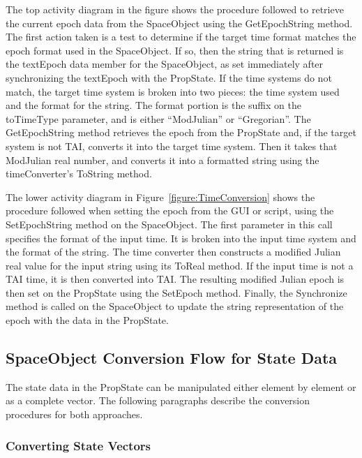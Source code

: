 The top activity diagram in the figure shows the procedure followed to retrieve the current epoch
data from the SpaceObject using the GetEpochString method.  The first action taken is a test to
determine if the target time format matches the epoch format used in the SpaceObject.  If so, then
the string that is returned is the textEpoch data member for the SpaceObject, as set immediately
after synchronizing the textEpoch with the PropState.  If the time systems do not match, the target
time system is broken into two pieces: the time system used and the format for the string. The
format portion is the suffix on the toTimeType parameter, and is either ``ModJulian'' or
``Gregorian''.  The GetEpochString method retrieves the epoch from the PropState and, if the
 target system is not TAI, converts it into the target time system.  Then it takes that ModJulian
real number, and converts it into a formatted string using the timeConverter's ToString method.

The lower activity diagram in Figure~\ref{figure:TimeConversion} shows the procedure followed when
setting the epoch from the GUI or script, using the SetEpochString method on the SpaceObject.  The
first parameter in this call specifies the format of the input time.  It is broken into the input
time system and the format of the string.  The time converter then constructs a modified Julian
real value for the input string using its ToReal method.  If the input time is not a TAI time, it
is then converted into TAI.  The resulting modified Julian epoch is then set on the PropState using
the SetEpoch method.  Finally, the Synchronize method is called on the SpaceObject to update the
string representation of the epoch with the data in the PropState.

\subsection{SpaceObject Conversion Flow for State Data}

The state data in the PropState can be manipulated either element by element or as a complete
vector.  The following paragraphs describe the conversion procedures for both approaches.

\subsubsection{Converting State Vectors}

